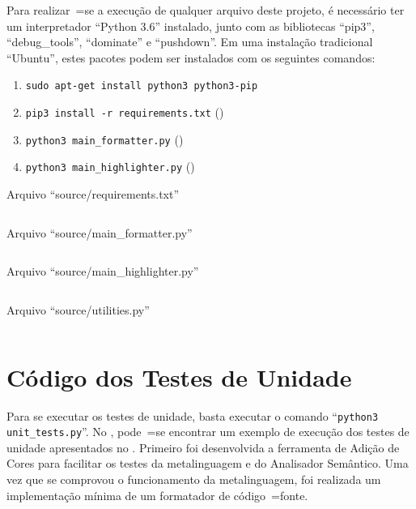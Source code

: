 Para realizar~=se a execução de qualquer arquivo deste projeto,
é necessário ter um interpretador ``Python 3.6'' instalado,
junto com as bibliotecas ``pip3'',
``debug\_tools'', ``dominate'' e
``pushdown''.
Em uma instalação tradicional ``Ubuntu'',
estes pacotes podem ser instalados com os seguintes comandos:
\begin{enumerate}[1)]
\item \texttt{sudo apt-get install python3 python3-pip}
\item \texttt{pip3 install -r requirements.txt} ()
\item \texttt{python3 main_formatter.py} ()
\item \texttt{python3 main_highlighter.py} ()
\end{enumerate}
\begin{code}
\caption{Arquivo ``source/requirements.txt''}
\label{requirementsTxt}
\inputminted[fontsize=\small,fontfamily=zi4,linenos=true,numberblanklines=true,breaklines=true]{python3}{../source/requirements.txt}
\end{code}
\begin{code}
\caption{Arquivo ``source/main\_formatter.py''}
\label{mainHighlighterPy}
\inputminted[fontsize=\small,fontfamily=zi4,linenos=true,numberblanklines=true,breaklines=true]{python3}{../source/main_formatter.py}
\end{code}
\begin{code}
\caption{Arquivo ``source/main\_highlighter.py''}
\label{mainFormatterPy}
\inputminted[fontsize=\small,fontfamily=zi4,linenos=true,numberblanklines=true,breaklines=true]{python3}{../source/main_formatter.py}
\end{code}
\begin{code}
\caption{Arquivo ``source/utilities.py''}
\label{utilitiesPy}
\inputminted[fontsize=\small,fontfamily=zi4,linenos=true,numberblanklines=true,breaklines=true]{python3}{../source/utilities.py}
\end{code}


\chapter{Código dos Testes de Unidade}

Para se executar os testes de unidade,
basta executar o comando ``\texttt{python3 unit_tests.py}''.
No ,
pode~=se encontrar um exemplo de execução dos testes de unidade apresentados no .
Primeiro foi desenvolvida a ferramenta de Adição de Cores para facilitar os testes da metalinguagem e
do Analisador Semântico.
Uma vez que se comprovou o funcionamento da metalinguagem,
foi realizada um implementação mínima de um formatador de código~=fonte.

